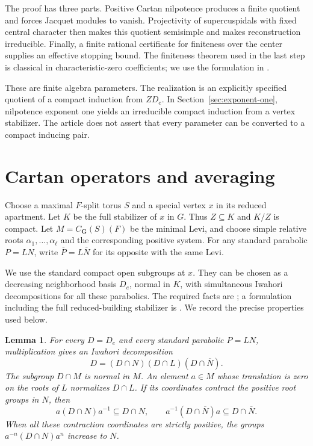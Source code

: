 \documentclass[10pt,letterpaper]{amsart}
\numberwithin{equation}{section}
\newtheorem{lemma}[theorem]{Lemma}
\theoremstyle{remark}
\begin{document}
The proof has three parts. Positive Cartan nilpotence produces a finite
quotient and forces Jacquet modules to vanish. Projectivity of supercuspidals
with fixed central character then makes this quotient semisimple and makes
reconstruction irreducible. Finally, a finite rational certificate for
finiteness over the center supplies an effective stopping bound. The
finiteness theorem used in the last step is classical in characteristic-zero
coefficients; we use the formulation in \cite[Theorem~1.1]{DHKM}.

These are finite algebra parameters. The realization is an explicitly
specified quotient of a compact induction from $ZD_e$. In
Section~\ref{sec:exponent-one}, nilpotence exponent one yields an irreducible
compact induction from a vertex stabilizer. The article does not assert
that every parameter can be converted to a compact inducing pair.

\section{Cartan operators and averaging}
\label{sec:cartan-operators}

Choose a maximal $F$-split torus $S$ and a special vertex $x$ in its reduced
apartment. Let $K$ be the full stabilizer of $x$ in $G$. Thus $Z\subseteq K$
and $K/Z$ is compact. Let $M=C_{\mathbf G}(S)(F)$ be the minimal Levi, and
choose simple relative roots $\alpha_1,\ldots,\alpha_\ell$ and the
corresponding positive system. For any standard parabolic $P=LN$,
write $\overline P=L\overline N$ for its opposite with the same Levi.

We use the standard compact open subgroups at $x$. They can be chosen as a
decreasing neighborhood basis $D_e$, normal in $K$, with simultaneous
Iwahori decompositions for all these parabolics. The required facts are
\cite[Section~I.2, Proposition~7 and Corollaries~8--9]{SS}; a formulation
including the full reduced-building stabilizer is
\cite[Theorem~3.11(a)--(d)]{Solleveld}. We record the precise properties
used below.

\begin{lemma}\label{lem:group-input}
For every $D=D_e$ and every standard parabolic $P=LN$, multiplication gives
an Iwahori decomposition
\[
 D=(D\cap N)(D\cap L)(D\cap\overline N).
\]
The subgroup $D\cap M$ is normal in $M$. An element $a\in M$ whose
translation is zero on the roots of $L$ normalizes $D\cap L$. If its
coordinates contract the positive root groups in $N$, then
\[
 a(D\cap N)a^{-1}\subseteq D\cap N,\qquad
 a^{-1}(D\cap\overline N)a\subseteq D\cap\overline N.
\]
When all these contraction coordinates are strictly positive, the groups
$a^{-n}(D\cap N)a^n$ increase to $N$.
\end{lemma}
\end{document}
